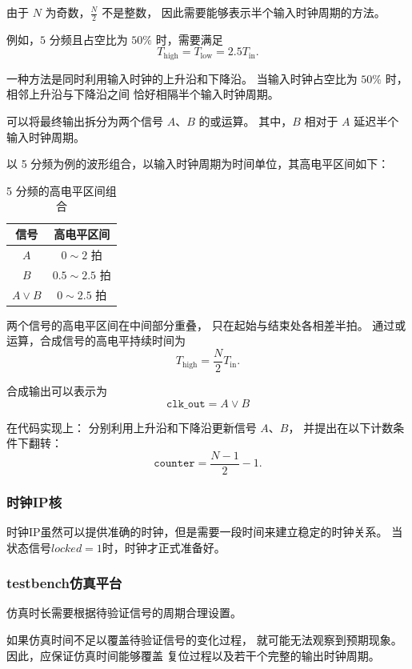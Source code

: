 由于 $N$ 为奇数，$\frac{N}{2}$ 不是整数，
因此需要能够表示半个输入时钟周期的方法。

例如，$5$ 分频且占空比为 $50\%$ 时，需要满足
\[
T_{\mathrm{high}} = T_{\mathrm{low}}
= 2.5T_{\mathrm{in}}.
\]

一种方法是同时利用输入时钟的上升沿和下降沿。
当输入时钟占空比为 $50\%$ 时，相邻上升沿与下降沿之间
恰好相隔半个输入时钟周期。

可以将最终输出拆分为两个信号 $A$、$B$ 的或运算。
其中，$B$ 相对于 $A$ 延迟半个输入时钟周期。

以 5 分频为例的波形组合，以输入时钟周期为时间单位，其高电平区间如下：

\begin{table}[H]
  \centering
  \caption{5 分频的高电平区间组合}
  \begin{tabular}{cc}
    \toprule
    信号 & 高电平区间 \\
    \midrule
    $A$ & $0 \sim 2$ 拍 \\
    $B$ & $0.5 \sim 2.5$ 拍 \\
    $A \lor B$ & $0 \sim 2.5$ 拍 \\
    \bottomrule
  \end{tabular}
\end{table}

两个信号的高电平区间在中间部分重叠，
只在起始与结束处各相差半拍。
通过或运算，合成信号的高电平持续时间为
\[
T_{\mathrm{high}} = \frac{N}{2}T_{\mathrm{in}}.
\]

合成输出可以表示为
\[
\boxed{\texttt{clk\_out} = A \lor B}
\]

在代码实现上：
分别利用上升沿和下降沿更新信号 $A$、$B$，
并提出在以下计数条件下翻转：
\[
\texttt{counter} = \frac{N-1}{2}-1.
\]


\subsubsection{时钟IP核}
时钟IP虽然可以提供准确的时钟，但是需要一段时间来建立稳定的时钟关系。
当状态信号$ locked = 1 $时，时钟才正式准备好。


\subsubsection{testbench仿真平台}

仿真时长需要根据待验证信号的周期合理设置。

如果仿真时间不足以覆盖待验证信号的变化过程，
就可能无法观察到预期现象。因此，应保证仿真时间能够覆盖
复位过程以及若干个完整的输出时钟周期。